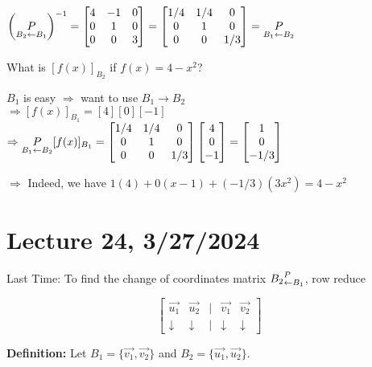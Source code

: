 \documentclass{article}
\begin{document}
$\left(\underset{B_2 \leftarrow B_1}{\large P}\right)^{-1} = \begin{bmatrix} 4 & -1 & 0 \\ 0 & 1 & 0 \\ 0 & 0 & 3 \end{bmatrix} = \begin{bmatrix} 1/4 & 1/4 & 0 \\ 0 & 1 & 0 \\ 0 & 0 & 1/3 \end{bmatrix} = \underset{B_1 \leftarrow B_2}{\large P}$ 

What is $[f(x)]_{B_2}$ if $f(x) = 4-x^{2}$?

$B_1$ is easy $\Rightarrow$ want to use $B_1 \rightarrow B_2$ \\
$\Rightarrow [f(x)]_{B_1} = [4][0][-1]$ \\
$\Rightarrow \underset{B_1 \leftarrow B_2}{\large P}[f(x)]_{B_1} = \begin{bmatrix} 1/4 & 1/4 & 0 \\ 0 & 1 & 0 \\ 0 & 0 & 1/3 \end{bmatrix} \begin{bmatrix} 4 \\ 0 \\ -1 \end{bmatrix} = \begin{bmatrix} 1 \\ 0 \\ -1/3 \end{bmatrix}$


$\Rightarrow$ Indeed, we have $1(4) + 0(x - 1) + (-1/3)(3x^2) = 4 - x^2$



\section{Lecture 24, 3/27/2024}

Last Time: To find the change of coordinates matrix 
${B_2}^{\large P}_{\leftarrow B_1}$, row reduce 

\[
\begin{bmatrix} 
\vec{u_1} & \vec{u_2} & | & \vec{v_1} & \vec{v_2} \\
\downarrow & \downarrow & | & \downarrow & \downarrow 
\end{bmatrix}
\]

\textbf{Definition:} Let \( B_1 = \{\vec{v_1}, \vec{v_2}\} \) and \( B_2 = \{\vec{u_1}, \vec{u_2}\} \).
\end{document}

